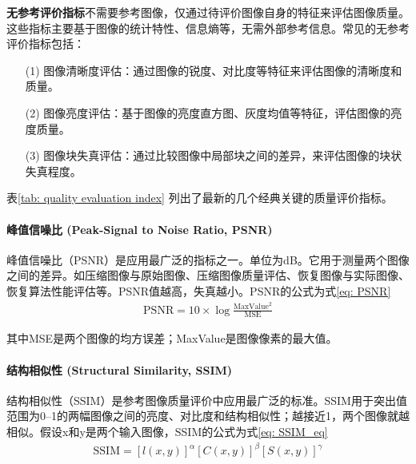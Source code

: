 \documentclass[a4paper]{ctexart}
\begin{document}
	\textbf{无参考评价指标}不需要参考图像，仅通过待评价图像自身的特征来评估图像质量。这些指标主要基于图像的统计特性、信息熵等，无需外部参考信息。常见的无参考评价指标包括：
	
	\begin{itemize}
		\item [(1)] 图像清晰度评估：通过图像的锐度、对比度等特征来评估图像的清晰度和质量。
		
		\item [(2)] 图像亮度评估：基于图像的亮度直方图、灰度均值等特征，评估图像的亮度质量。
		
		\item [(3)] 图像块失真评估：通过比较图像中局部块之间的差异，来评估图像的块状失真程度。
	\end{itemize}
	
	表\ref{tab: quality evaluation index} 列出了最新的几个经典关键的质量评价指标。
	
	\paragraph{峰值信噪比 (Peak-Signal to Noise Ratio, PSNR)} 峰值信噪比（PSNR）是应用最广泛的指标之一。单位为dB。它用于测量两个图像之间的差异。如压缩图像与原始图像、压缩图像质量评估、恢复图像与实际图像、恢复算法性能评估等。PSNR值越高，失真越小。PSNR的公式为式\ref{eq: PSNR}
	\begin{equation}
		\begin{aligned}
			\text{PSNR} = 10 \times \log \frac{\text{{MaxValue}}^2}{\text{MSE}}
		\end{aligned}
		\label{eq: PSNR}
	\end{equation}
	
	其中MSE是两个图像的均方误差；MaxValue是图像像素的最大值。
	
	\paragraph{结构相似性 (Structural Similarity, SSIM)} 结构相似性（SSIM）是参考图像质量评价中应用最广泛的标准。SSIM用于突出值范围为0–1的两幅图像之间的亮度、对比度和结构相似性；越接近1，两个图像就越相似。假设x和y是两个输入图像，SSIM的公式为式\ref{eq: SSIM_eq}
	\begin{equation}
		\begin{aligned}
			\text{SSIM} = {\left[ l(x,y) \right]}^{\alpha} {\left[C(x,y)\right]}^\beta {\left[S(x,y)\right]}^\gamma
		\end{aligned}
		\label{eq: SSIM_eq}
	\end{equation}
	
\end{document}
